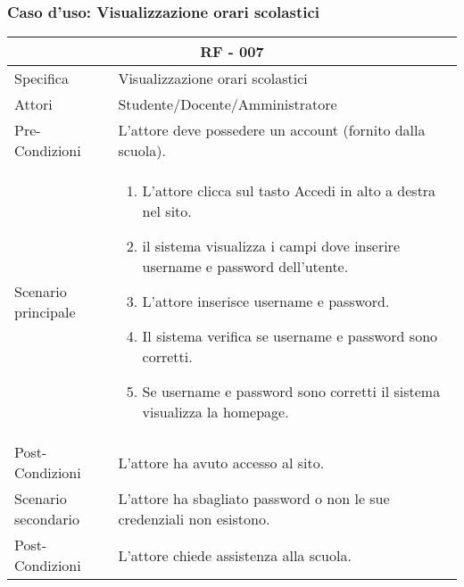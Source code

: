 \documentclass{article}
\begin{document}
\subsubsection{\textbf{Caso d'uso: Visualizzazione orari scolastici}}
\begin{tabular}{ |p{3cm}|p{9cm}|  }
	\hline
	\multicolumn{2}{|c|}{\textbf{RF - 007}} \\
	\hline
	Specifica& Visualizzazione orari scolastici\\
	\hline
	Attori& Studente/Docente/Amministratore\\
	\hline
	Pre-Condizioni& L'attore deve possedere un account (fornito dalla scuola).\\
	\hline
	Scenario principale& \begin{enumerate}
		\item L'attore clicca sul tasto Accedi in alto a destra nel sito.
		\item il sistema visualizza i campi dove inserire username e password dell'utente.
		\item L'attore inserisce username e password.
		\item Il sistema verifica se username e password sono corretti.
		\item Se username e password sono corretti il sistema visualizza la homepage.
	\end{enumerate}\\
	\hline
	Post-Condizioni& L'attore ha avuto accesso al sito.\\
	\hline
	Scenario secondario& L'attore ha sbagliato password o non le sue credenziali non esistono.\\
	\hline
	Post-Condizioni& L'attore chiede assistenza alla scuola.\\
	\hline
\end{tabular}
\end{document}
